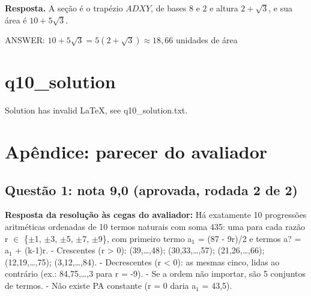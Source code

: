 \documentclass{article}%
\begin{document}
\textbf{Resposta.} A seção é o trapézio $ADXY$, de bases $8$ e $2$ e altura $2+\sqrt{3}$, e sua área é $10+5\sqrt{3}$.

ANSWER: $10+5\sqrt{3}=5(2+\sqrt{3})\approx 18{,}66$ unidades de área%
\newpage%
\section*{q10_solution}%
Solution has invalid LaTeX, see q10\_solution.txt.%
\newpage%
\section*{Apêndice: parecer do avaliador}%
\subsection*{Questão 1: nota 9,0 (aprovada, rodada 2 de 2)}%
\textbf{Resposta da resolução às cegas do avaliador:} Há exatamente 10 progressões aritméticas ordenadas de 10 termos naturais com soma 435: uma para cada razão r $\in$ \{$\pm$1, $\pm$3, $\pm$5, $\pm$7, $\pm$9\}, com primeiro termo a$_{1}$ = (87 - 9r)/2 e termos a? = a$_{1}$ + (k-1)r.\newline%
\newline%
{-} Crescentes (r > 0): (39,\ldots{},48); (30,33,\ldots{},57); (21,26,\ldots{},66); (12,19,\ldots{},75); (3,12,\ldots{},84).\newline%
{-} Decrescentes (r < 0): as mesmas cinco, lidas ao contrário (ex.: 84,75,\ldots{},3 para r = -9).\newline%
{-} Se a ordem não importar, são 5 conjuntos de termos.\newline%
{-} Não existe PA constante (r = 0 daria a$_{1}$ = 43,5).\newline%
\newline%
\end{document}
